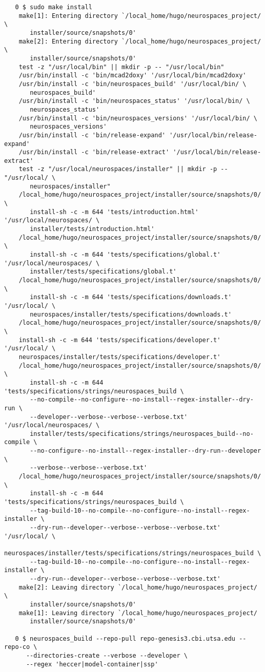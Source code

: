 \documentclass[12pt]{article}
\begin{document}
\begin{verbatim}
   0 $ sudo make install
    make[1]: Entering directory `/local_home/hugo/neurospaces_project/ \
       installer/source/snapshots/0'
    make[2]: Entering directory `/local_home/hugo/neurospaces_project/ \
       installer/source/snapshots/0'
    test -z "/usr/local/bin" || mkdir -p -- "/usr/local/bin"
    /usr/bin/install -c 'bin/mcad2doxy' '/usr/local/bin/mcad2doxy'
    /usr/bin/install -c 'bin/neurospaces_build' '/usr/local/bin/ \
       neurospaces_build'
    /usr/bin/install -c 'bin/neurospaces_status' '/usr/local/bin/ \
       neurospaces_status'
    /usr/bin/install -c 'bin/neurospaces_versions' '/usr/local/bin/ \
       neurospaces_versions'
    /usr/bin/install -c 'bin/release-expand' '/usr/local/bin/release-expand'
    /usr/bin/install -c 'bin/release-extract' '/usr/local/bin/release-extract'
    test -z "/usr/local/neurospaces/installer" || mkdir -p -- "/usr/local/ \
       neurospaces/installer"
    /local_home/hugo/neurospaces_project/installer/source/snapshots/0/ \
       install-sh -c -m 644 'tests/introduction.html' '/usr/local/neurospaces/ \
       installer/tests/introduction.html'
    /local_home/hugo/neurospaces_project/installer/source/snapshots/0/ \
       install-sh -c -m 644 'tests/specifications/global.t' '/usr/local/neurospaces/ \
       installer/tests/specifications/global.t'
    /local_home/hugo/neurospaces_project/installer/source/snapshots/0/ \
       install-sh -c -m 644 'tests/specifications/downloads.t' '/usr/local/ \
       neurospaces/installer/tests/specifications/downloads.t'
    /local_home/hugo/neurospaces_project/installer/source/snapshots/0/ \
    install-sh -c -m 644 'tests/specifications/developer.t' '/usr/local/ \
    neurospaces/installer/tests/specifications/developer.t'
    /local_home/hugo/neurospaces_project/installer/source/snapshots/0/ \
       install-sh -c -m 644 'tests/specifications/strings/neurospaces_build \
       --no-compile--no-configure--no-install--regex-installer--dry-run \
       --developer--verbose--verbose--verbose.txt' '/usr/local/neurospaces/ \
       installer/tests/specifications/strings/neurospaces_build--no-compile \
       --no-configure--no-install--regex-installer--dry-run--developer \
       --verbose--verbose--verbose.txt'
    /local_home/hugo/neurospaces_project/installer/source/snapshots/0/ \
       install-sh -c -m 644 'tests/specifications/strings/neurospaces_build \
       --tag-build-10--no-compile--no-configure--no-install--regex-installer \
       --dry-run--developer--verbose--verbose--verbose.txt' '/usr/local/ \
       neurospaces/installer/tests/specifications/strings/neurospaces_build \
       --tag-build-10--no-compile--no-configure--no-install--regex-installer \
       --dry-run--developer--verbose--verbose--verbose.txt'
    make[2]: Leaving directory `/local_home/hugo/neurospaces_project/ \
       installer/source/snapshots/0'
    make[1]: Leaving directory `/local_home/hugo/neurospaces_project/ 
       installer/source/snapshots/0'

   0 $ neurospaces_build --repo-pull repo-genesis3.cbi.utsa.edu --repo-co \
      --directories-create --verbose --developer \
      --regex 'heccer|model-container|ssp'
   
\end{verbatim}
\end{document}
